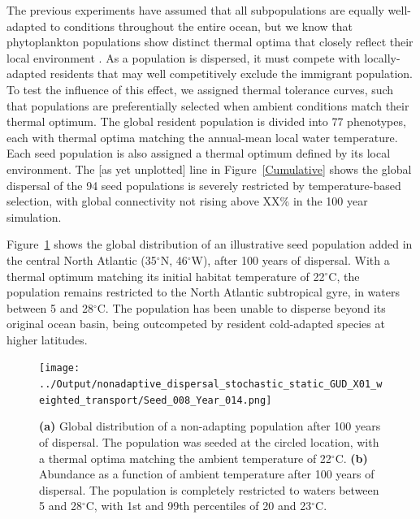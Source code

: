 \documentclass[12pt]{article}
\begin{document}
The previous experiments have assumed that all subpopulations are equally well-adapted to conditions throughout the entire ocean, but we know that phytoplankton populations show distinct thermal optima that closely reflect their local environment \citep{Thomas:2012,ODonnell:2018}. As a population is dispersed, it must compete with locally-adapted residents that may well competitively exclude the immigrant population. To test the influence of this effect, we assigned thermal tolerance curves, such that populations are preferentially selected when ambient conditions match their thermal optimum. The global resident population is divided into 77 phenotypes, each with thermal optima matching the annual-mean local water temperature. Each seed population is also assigned a thermal optimum defined by its local environment. The [as yet unplotted] line in Figure~\ref{Cumulative} shows the global dispersal of the 94 seed populations is severely restricted by temperature-based selection, with global connectivity not rising above XX\% in the 100 year simulation. 

Figure~\ref{} shows the global distribution of an illustrative seed population added in the central North Atlantic (35$^\circ$N, 46$^\circ$W), after 100 years of dispersal. With a thermal optimum matching its initial habitat temperature of 22$^{\circ}$C, the population remains restricted to the North Atlantic subtropical gyre, in waters between 5 and 28$^\circ$C. The population has been unable to disperse beyond its original ocean basin, being outcompeted by 
resident cold-adapted species at higher latitudes.

\begin{figure}[t!]
    \centering
        \texttt{[image: ../Output/nonadaptive\_dispersal\_stochastic\_static\_GUD\_X01\_weighted\_transport/Seed\_008\_Year\_014.png]}
    \caption{\textbf{(a)} Global distribution of a non-adapting population after 100 years of dispersal. The population was seeded at the circled location, with a thermal optima matching the ambient temperature of 22$^\circ$C. \textbf{(b)} Abundance as a function of ambient temperature after 100 years of dispersal. The population is completely restricted to waters between 5 and 28$^\circ$C, with 1st and 99th percentiles of 20 and 23$^\circ$C.}
\label{}
\end{figure}
\end{document}
